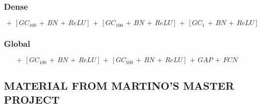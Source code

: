 \documentclass{article} %
\begin{document}
\subsubsection*{Dense}

\begin{dmath}
    [GC_{50}\, +\, BN\, +\, ReLU]\, +\, [GC_{100}\, +\, BN\, +\, ReLU]\, +\, [GC_{100}\, +\, BN\, +\, ReLU]\, +\, [GC_{1}\, +\, BN\, +\, ReLU]
\end{dmath}

\subsubsection*{Global}

\begin{dmath}
    [GC_{50}\, +\, BN\, +\, ReLU]\, +\, [GC_{100}\, +\, BN\, +\, ReLU]\, +\, [GC_{100}\, +\, BN\, +\, ReLU]\, +\, GAP\, +\, FCN
\end{dmath}

\subsection{MATERIAL FROM MARTINO'S MASTER PROJECT}

\end{document}
